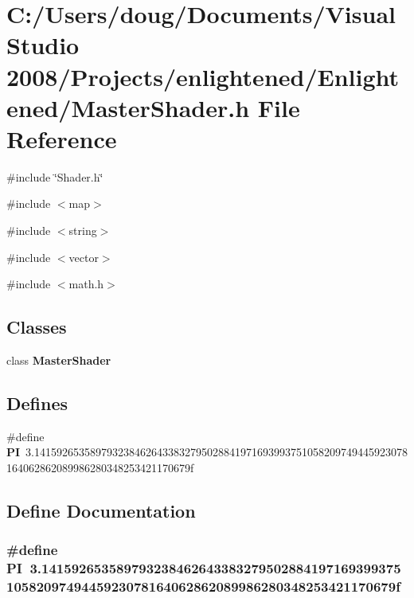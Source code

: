\section{C:/Users/doug/Documents/Visual Studio 2008/Projects/enlightened/Enlightened/MasterShader.h File Reference}
\label{_master_shader_8h}
{\ttfamily \#include \char`\"{}Shader.h\char`\"{}}\par
{\ttfamily \#include $<$map$>$}\par
{\ttfamily \#include $<$string$>$}\par
{\ttfamily \#include $<$vector$>$}\par
{\ttfamily \#include $<$math.h$>$}\par
\subsection*{Classes}
\begin{DoxyCompactItemize}
\item 
class {\bf MasterShader}
\end{DoxyCompactItemize}
\subsection*{Defines}
\begin{DoxyCompactItemize}
\item 
\#define {\bf PI}~3.1415926535897932384626433832795028841971693993751058209749445923078164062862089986280348253421170679f
\end{DoxyCompactItemize}


\subsection{Define Documentation}
\subsubsection[{PI}]{\setlength{\rightskip}{0pt plus 5cm}\#define PI~3.1415926535897932384626433832795028841971693993751058209749445923078164062862089986280348253421170679f}\label{_master_shader_8h_a598a3330b3c21701223ee0ca14316eca}
